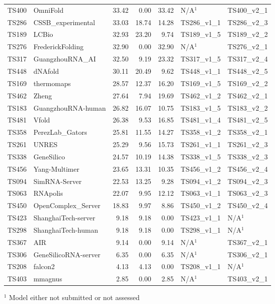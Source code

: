 \begin{table}[ht]
{\begin{tabular}{llrrrll}
TS400 & OmniFold & 33.42 & 0.00 & 33.42 & N/A$^{1}$ & TS400\_v2\_1 \\ 
TS286 & CSSB\_experimental & 33.03 & 18.74 & 14.28 & TS286\_v1\_1 & TS286\_v2\_3 \\ 
TS189 & LCBio & 32.93 & 23.20 & 9.74 & TS189\_v1\_5 & TS189\_v2\_2 \\ 
TS276 & FrederickFolding & 32.90 & 0.00 & 32.90 & N/A$^{1}$ & TS276\_v2\_1 \\ 
TS317 & GuangzhouRNA\_AI & 32.50 & 9.19 & 23.32 & TS317\_v1\_5 & TS317\_v2\_4 \\ 
TS448 & dNAfold & 30.11 & 20.49 & 9.62 & TS448\_v1\_1 & TS448\_v2\_5 \\ 
TS169 & thermomaps & 28.57 & 12.37 & 16.20 & TS169\_v1\_5 & TS169\_v2\_2 \\ 
TS462 & Zheng & 27.64 & 7.94 & 19.69 & TS462\_v1\_2 & TS462\_v2\_1 \\ 
TS183 & GuangzhouRNA-human & 26.82 & 16.07 & 10.75 & TS183\_v1\_5 & TS183\_v2\_2 \\ 
TS481 & Vfold & 26.38 & 9.53 & 16.85 & TS481\_v1\_4 & TS481\_v2\_5 \\ 
TS358 & PerezLab\_Gators & 25.81 & 11.55 & 14.27 & TS358\_v1\_2 & TS358\_v2\_1 \\ 
TS261 & UNRES & 25.29 & 9.56 & 15.73 & TS261\_v1\_1 & TS261\_v2\_3 \\ 
TS338 & GeneSilico & 24.57 & 10.19 & 14.38 & TS338\_v1\_5 & TS338\_v2\_3 \\ 
TS456 & Yang-Multimer & 23.65 & 13.31 & 10.35 & TS456\_v1\_2 & TS456\_v2\_4 \\ 
TS094 & SimRNA-Server & 22.53 & 13.25 & 9.28 & TS094\_v1\_2 & TS094\_v2\_3 \\ 
TS063 & RNApolis & 22.07 & 9.95 & 12.12 & TS063\_v1\_1 & TS063\_v2\_3 \\ 
TS450 & OpenComplex\_Server & 18.83 & 9.97 & 8.86 & TS450\_v1\_2 & TS450\_v2\_4 \\ 
TS423 & ShanghaiTech-server & 9.18 & 9.18 & 0.00 & TS423\_v1\_1 & N/A$^{1}$ \\ 
TS298 & ShanghaiTech-human & 9.18 & 9.18 & 0.00 & TS298\_v1\_1 & N/A$^{1}$ \\ 
TS367 & AIR & 9.14 & 0.00 & 9.14 & N/A$^{1}$ & TS367\_v2\_1 \\ 
TS306 & GeneSilicoRNA-server & 6.35 & 0.00 & 6.35 & N/A$^{1}$ & TS306\_v2\_1 \\ 
TS208 & falcon2 & 4.13 & 4.13 & 0.00 & TS208\_v1\_1 & N/A$^{1}$ \\ 
TS403 & mmagnus & 2.85 & 0.00 & 2.85 & N/A$^{1}$ & TS403\_v2\_1 \\ 
\bottomrule
\end{tabular}%
}
\begin{flushleft}\footnotesize $^{1}$ Model either not submitted or not assessed\end{flushleft}
\end{table}
